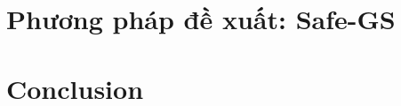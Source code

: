 \documentclass[12pt]{report}
\begin{document}
\chapter{Phương pháp đề xuất: Safe-GS}
\label{chapter:baseline}






\chapter{Conclusion}
\label{chapter:conclusion}


% 
% 
\end{document}
